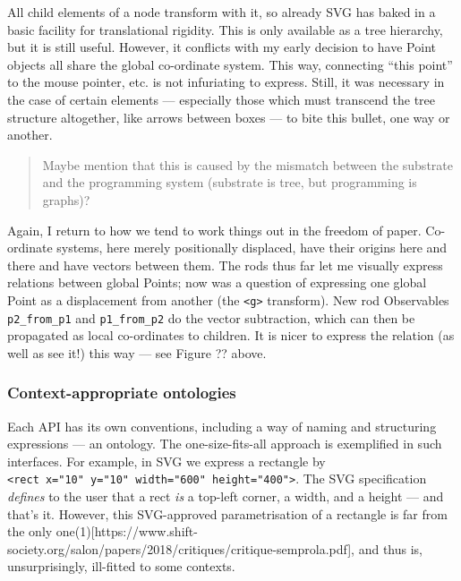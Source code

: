 \documentclass[english,submission]{programming}
\begin{document}
  All child elements of a node transform with it, so already SVG has baked
  in a basic facility for translational rigidity. This is only available
  as a tree hierarchy, but it is still useful. However, it conflicts with
  my early decision to have Point objects all share the global co-ordinate
  system. This way, connecting ``this point'' to the mouse pointer, etc.
  is not infuriating to express. Still, it was necessary in the case of
  certain elements --- especially those which must transcend the tree
  structure altogether, like arrows between boxes --- to bite this bullet,
  one way or another.

  \begin{quote}
  Maybe mention that this is caused by the mismatch between the substrate
  and the programming system (substrate is tree, but programming is
  graphs)?
  \end{quote}

  Again, I return to how we tend to work things out in the freedom of
  paper. Co-ordinate systems, here merely positionally displaced, have
  their origins here and there and have vectors between them. The rods
  thus far let me visually express relations between global Points; now
  was a question of expressing one global Point as a displacement from
  another (the \texttt{\textless{}g\textgreater{}} transform). New rod
  Observables \texttt{p2\_from\_p1} and \texttt{p1\_from\_p2} do the
  vector subtraction, which can then be propagated as local co-ordinates
  to children. It is nicer to express the relation (as well as see it!)
  this way --- see Figure ?? above.

  \hypertarget{context-appropriate-ontologies}{%
  \subsubsection{Context-appropriate
  ontologies}\label{context-appropriate-ontologies}}

  Each API has its own conventions, including a way of naming and
  structuring expressions --- an ontology. The one-size-fits-all approach
  is exemplified in such interfaces. For example, in SVG we express a
  rectangle by
  \texttt{\textless{}rect\ x="10"\ y="10"\ width="600"\ height="400"\textgreater{}}.
  The SVG specification \emph{defines} to the user that a rect \emph{is} a
  top-left corner, a width, and a height --- and that's it. However, this
  SVG-approved parametrisation of a rectangle is far from the only
  one(1){[}https://www.shift-society.org/salon/papers/2018/critiques/critique-semprola.pdf{]},
  and thus is, unsurprisingly, ill-fitted to some contexts.
\end{document}
